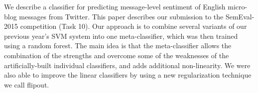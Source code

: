 We describe a classifier for predicting message-level sentiment of English micro- blog messages from Twitter. This paper describes our submission to the SemEval- 2015 competition (Task 10). Our approach is to combine several variants of our previous year's SVM system into one meta-classifier, which was then trained using a random forest. The main idea is that the meta-classifier allows the combination of the strengths and overcome some of the weaknesses of the artificially-built individual classifiers, and adds additional non-linearity. We were also able to improve the linear classifiers by using a new regularization technique we call flipout.
